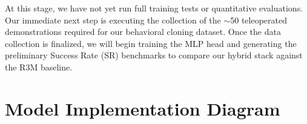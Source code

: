\documentclass[conference]{IEEEtran}
\begin{document}
At this stage, we have not yet run full training tests or quantitative evaluations. Our immediate next step is executing the collection of the $\sim$50 teleoperated demonstrations required for our behavioral cloning dataset. Once the data collection is finalized, we will begin training the MLP head and generating the preliminary Success Rate (SR) benchmarks to compare our hybrid stack against the R3M baseline.

\section{Model Implementation Diagram}
\begin{figure}[h]
    \centering
    
\end{figure}




\end{document}
